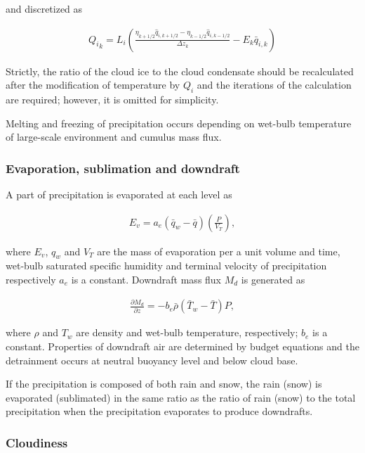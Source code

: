 and discretized as

\begin{eqnarray}
 {Q_i}_k = L_i \left(\frac{\eta_{k+1/2} \hat{q}_{i,k+1/2} - \eta_{k-1/2} \hat{q}_{i,k-1/2}}{\Delta z_k} - E_k \bar{q}_{i,k} \right)
\end{eqnarray}

Strictly, the ratio of the cloud ice to the cloud condensate should be
recalculated after the modification of temperature by \(Q_i\) and the
iterations of the calculation are required; however, it is omitted for
simplicity.

Melting and freezing of precipitation occurs depending on wet-bulb
temperature of large-scale environment and cumulus mass flux.

\hypertarget{evaporation-sublimation-and-downdraft}{%
\subsubsection{Evaporation, sublimation and
downdraft}\label{evaporation-sublimation-and-downdraft}}

A part of precipitation is evaporated at each level as

\begin{eqnarray}
 E_v = a_e (\bar{q}_w - \bar{q}) \left(\frac{P}{V_T}\right),
\end{eqnarray}

where \(E_v\), \(q_w\) and \(V_T\) are the mass of evaporation per a
unit volume and time, wet-bulb saturated specific humidity and terminal
velocity of precipitation respectively \(a_e\) is a constant. Downdraft
mass flux \(M_d\) is generated as

\begin{eqnarray}
 \frac{\partial M_d}{\partial z} = -b_e \bar{\rho} (\bar{T}_w - \bar{T}) P,
\end{eqnarray}

where \(\rho\) and \(T_w\) are density and wet-bulb temperature,
respectively; \(b_e\) is a constant. Properties of downdraft air are
determined by budget equations and the detrainment occurs at neutral
buoyancy level and below cloud base.

If the precipitation is composed of both rain and snow, the rain (snow)
is evaporated (sublimated) in the same ratio as the ratio of rain (snow)
to the total precipitation when the precipitation evaporates to produce
downdrafts.

\hypertarget{cloudiness}{%
\subsubsection{Cloudiness}\label{cloudiness}}

